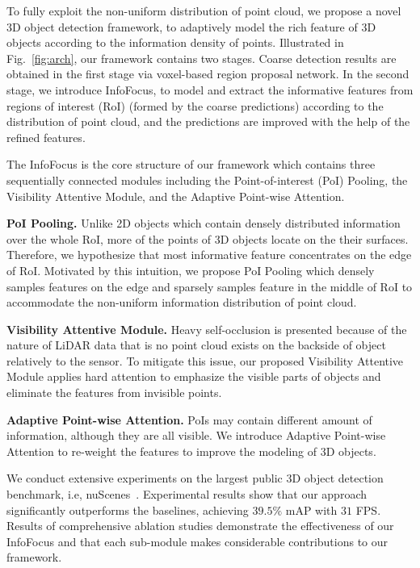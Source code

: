 \documentclass[runningheads]{llncs}
\begin{document}
To fully exploit the non-uniform distribution of point cloud, we propose a novel 3D object detection framework, to adaptively model the rich feature of 3D objects according to the information density of points. Illustrated in Fig.~\ref{fig:arch}, our framework contains two stages. Coarse detection results are obtained in the first stage via voxel-based region proposal network. In the second stage, we introduce InfoFocus, to model and extract the informative features from regions of interest (RoI) (formed by the coarse predictions) according to the distribution of point cloud, and the predictions are improved with the help of the refined features.

The InfoFocus is the core structure of our framework which contains three sequentially connected modules including the Point-of-interest (PoI) Pooling, the Visibility Attentive Module, and the Adaptive Point-wise Attention. 

\textbf{PoI Pooling.} Unlike 2D objects which contain densely distributed information over the whole RoI, more of the points of 3D objects locate on the their surfaces. Therefore, we hypothesize that most informative feature concentrates on the edge of RoI. Motivated by this intuition, we propose PoI Pooling which densely samples features on the edge and sparsely samples feature in the middle of RoI to accommodate the non-uniform information distribution of point cloud.

\textbf{Visibility Attentive Module.} Heavy self-occlusion is presented because of the nature of LiDAR data that is no point cloud exists on the backside of object relatively to the sensor. To mitigate this issue, our proposed Visibility Attentive Module applies hard attention to emphasize the visible parts of objects and eliminate the features from invisible points.

\textbf{Adaptive Point-wise Attention.} PoIs may contain different amount of information, although they are all visible. We introduce Adaptive Point-wise Attention to re-weight the features to improve the modeling of 3D objects.

We conduct extensive experiments on the largest public 3D object detection benchmark, i.e, nuScenes~\cite{caesar2019nuscenes}. Experimental results show that our approach significantly outperforms the baselines, achieving $39.5\%$ mAP  with $31$ FPS. Results of comprehensive ablation studies demonstrate the effectiveness of our InfoFocus and that each sub-module makes considerable contributions to our framework.
\end{document}
